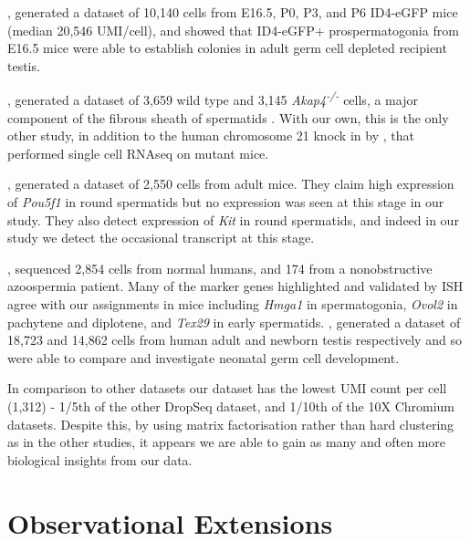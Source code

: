 \cite{Law2019Developmental}, generated a dataset of 10,140 cells from E16.5, P0, P3, and P6 ID4-eGFP mice (median 20,546 UMI/cell), and showed that ID4-eGFP+ prospermatogonia from E16.5 mice were able to establish colonies in adult germ cell depleted recipient testis.

\cite{Fang2019Proteomics}, generated a dataset of 3,659 wild type and 3,145 \textit{Akap4\textsuperscript{-/-}} cells, a major component of the fibrous sheath of spermatids \parencite{Eddy2003Fibrous}.
With our own, this is the only other study, in addition to the human chromosome 21 knock in by \cite{Ernst2019Staged}, that performed single cell RNAseq on mutant mice.

\cite{Lukassen2018Characterization}, generated a dataset of 2,550 cells from adult mice.
They claim high expression of \textit{Pou5f1} in round spermatids but no expression was seen at this stage in our study.
They also detect expression of \textit{Kit} in round spermatids, and indeed in our study we detect the occasional transcript at this stage.


\cite{Wang2018SingleCell}, sequenced 2,854 cells from normal humans, and 174 from a nonobstructive azoospermia patient.
Many of the marker genes highlighted and validated by ISH agree with our assignments in mice including \textit{Hmga1} in spermatogonia, \textit{Ovol2} in pachytene and diplotene, and \textit{Tex29} in early spermatids.
\cite{Sohni2019Neonatal}, generated a dataset of 18,723 and 14,862 cells from human adult and newborn testis respectively and so were able to compare and investigate neonatal germ cell development.

In comparison to other datasets our dataset has the lowest UMI count per cell (1,312) - 1/5th of the other DropSeq dataset, and 1/10th of the 10X Chromium datasets.
Despite this, by using matrix factorisation rather than hard clustering as in the other studies, it appears we are able to gain as many and often more biological insights from our data.

\section{Observational Extensions}

